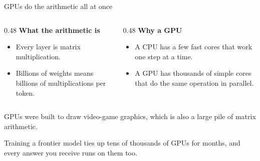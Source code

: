 \documentclass[aspectratio=169,11pt]{beamer}
\begin{document}
\begin{frame}{GPUs do the arithmetic all at once}

\begin{columns}[T]
\begin{column}{0.48\textwidth}
\textbf{What the arithmetic is}
\begin{itemize}\setlength\itemsep{0.25em}
    \item Every layer is matrix multiplication.
    \item Billions of weights means billions of multiplications per token.
\end{itemize}
\end{column}
\begin{column}{0.48\textwidth}
\textbf{Why a GPU}
\begin{itemize}\setlength\itemsep{0.25em}
    \item A CPU has a few fast cores that work one step at a time.
    \item A GPU has thousands of simple cores that do the same operation in parallel.
\end{itemize}
\end{column}
\end{columns}

\vspace{0.45cm}

GPUs were built to draw video-game graphics, which is also a large pile of matrix arithmetic.

\vspace{0.35cm}

\alert{Training a frontier model ties up tens of thousands of GPUs for months, and every answer you receive runs on them too.}

\end{frame}
\end{document}
